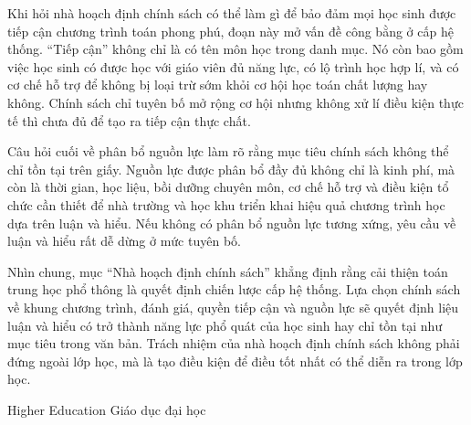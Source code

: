{{    Khi hỏi nhà hoạch định chính sách có thể làm gì để bảo đảm mọi học sinh được tiếp cận chương trình toán phong phú, đoạn này mở vấn đề công bằng ở cấp hệ thống. ``Tiếp cận'' không chỉ là có tên môn học trong danh mục. Nó còn bao gồm việc học sinh có được học với giáo viên đủ năng lực, có lộ trình học hợp lí, và có cơ chế hỗ trợ để không bị loại trừ sớm khỏi cơ hội học toán chất lượng hay không. Chính sách chỉ tuyên bố mở rộng cơ hội nhưng không xử lí điều kiện thực tế thì chưa đủ để tạo ra tiếp cận thực chất.

    Câu hỏi cuối về phân bổ nguồn lực làm rõ rằng mục tiêu chính sách không thể chỉ tồn tại trên giấy. Nguồn lực được phân bổ đầy đủ không chỉ là kinh phí, mà còn là thời gian, học liệu, bồi dưỡng chuyên môn, cơ chế hỗ trợ và điều kiện tổ chức cần thiết để nhà trường và học khu triển khai hiệu quả chương trình học dựa trên luận và hiểu. Nếu không có phân bổ nguồn lực tương xứng, yêu cầu về luận và hiểu rất dễ dừng ở mức tuyên bố.

    Nhìn chung, mục ``Nhà hoạch định chính sách'' khẳng định rằng cải thiện toán trung học phổ thông là quyết định chiến lược cấp hệ thống. Lựa chọn chính sách về khung chương trình, đánh giá, quyền tiếp cận và nguồn lực sẽ quyết định liệu luận và hiểu có trở thành năng lực phổ quát của học sinh hay chỉ tồn tại như mục tiêu trong văn bản. Trách nhiệm của nhà hoạch định chính sách không phải đứng ngoài lớp học, mà là tạo điều kiện để điều tốt nhất có thể diễn ra trong lớp học.}
  }

\ParallelSection
  {Higher Education}
  {Giáo dục đại học}
  {}

